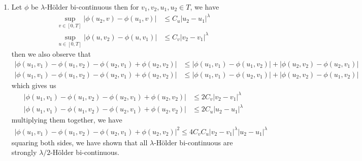 \documentclass[a4paper,12pt]{article}
\theoremstyle{definition}
\begin{document}
\begin{enumerate}



\item Let $\phi$ be $\lambda$-H\"{o}lder bi-continuous then for $v_1, v_2, u_1, u_2 \in T$, we have
\begin{align*}
\sup_{v \in [0,T]}|\phi(u_2,v)-\phi(u_1,v)| &\leq C_u|u_2-u_1|^\lambda\\
\sup_{u \in [0,T]}|\phi(u,v_2)-\phi(u,v_1)| &\leq C_v|v_2-v_1|^\lambda
\end{align*}
then we also observe that 
\begin{align*}
|\phi(u_1,v_1)-\phi(u_1,v_2)-\phi(u_2,v_1)+\phi(u_2,v_2)| &\leq |\phi(u_1,v_1)-\phi(u_1,v_2)|+|\phi(u_2,v_2)-\phi(u_2,v_1)| \\
|\phi(u_1,v_1)-\phi(u_1,v_2)-\phi(u_2,v_1)+\phi(u_2,v_2)| &\leq |\phi(u_1,v_1)-\phi(u_2,v_1)|+|\phi(u_2,v_2)-\phi(u_1,v_2)|
\end{align*}
which gives us 
\begin{align*}
|\phi(u_1,v_1)-\phi(u_1,v_2)-\phi(u_2,v_1)+\phi(u_2,v_2)| &\leq 2C_v|v_2-v_1|^\lambda \\
|\phi(u_1,v_1)-\phi(u_1,v_2)-\phi(u_2,v_1)+\phi(u_2,v_2)| &\leq 2C_u|u_2-u_1|^\lambda
\end{align*}
multiplying them together, we have 
\begin{align*}
|\phi(u_1,v_1)-\phi(u_1,v_2)-\phi(u_2,v_1)+\phi(u_2,v_2)|^2 \leq 4C_vC_u|v_2-v_1|^\lambda |u_2-u_1|^\lambda
\end{align*}
squaring both sides, we have shown that all $\lambda$-H\"{o}lder bi-continuous are strongly $\lambda/2$-H\"{o}lder bi-continuous.




\end{enumerate}
\end{document}
